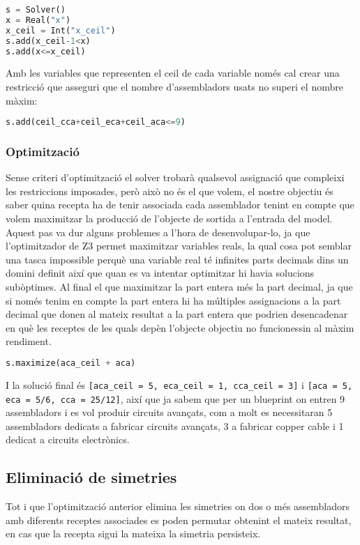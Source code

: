 \begin{lstlisting}[language=Python, caption=Ceil implementation 2]
s = Solver()
x = Real("x")
x_ceil = Int("x_ceil")
s.add(x_ceil-1<x)
s.add(x<=x_ceil)
\end{lstlisting}

Amb les variables que representen el ceil de cada variable només cal crear una restricció que asseguri que el nombre d'assembladors usats no superi el nombre màxim:

\begin{lstlisting}[language=Python, caption=Limit assemblers]
s.add(ceil_cca+ceil_eca+ceil_aca<=9)
\end{lstlisting}

\subsubsection{Optimització}
Sense criteri d'optimització el solver trobarà qualsevol assignació que compleixi les restriccions imposades, però això no és el que volem, el nostre objectiu és saber quina recepta ha de tenir associada cada assemblador tenint en compte que volem maximitzar la producció de l'objecte de sortida a l'entrada del model. Aquest pas va dur alguns problemes a l'hora de desenvolupar-lo, ja que l'optimitzador de Z3 permet maximitzar variables reals, la qual cosa pot semblar una tasca impossible perquè una variable real té infinites parts decimals dins un domini definit així que quan es va intentar optimitzar hi havia solucions subòptimes. Al final el que  maximitzar la part entera més la part decimal, ja que si només tenim en compte la part entera hi ha múltiples assignacions a la part decimal que donen al mateix resultat a la part entera que podrien desencadenar en què les receptes de les quals depèn l'objecte objectiu no funcionessin al màxim rendiment.

\begin{lstlisting}[language=Python, caption=Optimization]
s.maximize(aca_ceil + aca)
\end{lstlisting}

I la solució final és \texttt{[aca\_ceil = 5, eca\_ceil = 1, cca\_ceil = 3]} i \texttt{[aca = 5, eca = 5/6, cca = 25/12]}, així que ja sabem que per un blueprint on entren 9 assembladors i es vol produir circuits avançats, com a molt es necessitaran 5 assembladors dedicats a fabricar circuits avançats, 3 a fabricar copper cable i 1 dedicat a circuits electrònics.

\subsection{Eliminació de simetries}
Tot i que l'optimització anterior elimina les simetries on dos o més assembladors amb diferents receptes associades es poden permutar obtenint el mateix resultat, en cas que la recepta sigui la mateixa la simetria persisteix.\\

